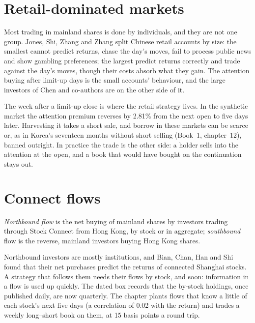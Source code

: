 \section{Retail-dominated markets}

Most trading in mainland shares is done by individuals, and they are not one group. Jones, Shi, Zhang and Zhang split Chinese retail accounts by
size: the smallest cannot predict returns, chase the day's moves, fail to process public news and show gambling preferences; the largest predict
returns correctly and trade against the day's moves, though their costs absorb what they gain. The attention buying after limit-up days is the
small accounts' behaviour, and the large investors of Chen and co-authors are on the other side of it.

The week after a limit-up close is where the retail strategy lives. In the synthetic market the attention premium reverses by 2.81\% from the next open
to five days later. Harvesting it takes a short sale, and borrow in these markets can be scarce or, as in Korea's seventeen months without short
selling (Book~1, chapter~12), banned outright. In practice the trade is the other side: a holder sells into the attention at the open, and a book that would have
bought on the continuation stays out.

\section{Connect flows}

\begin{definition}\label{def:s1:asia-specific-equity-strategies:northbound}
\emph{Northbound flow} is the net buying of mainland shares by investors trading through Stock Connect from Hong Kong, by
stock or in aggregate; \emph{southbound} flow is the reverse, mainland investors buying Hong Kong shares.
\end{definition}

Northbound investors are mostly institutions, and Bian, Chan, Han and Shi found that their net purchases predict the returns of connected Shanghai
stocks. A strategy that follows them needs their flows by stock, and soon: information in a flow is used up quickly. The dated box records that the
by-stock holdings, once published daily, are now quarterly. The chapter plants flows that know a little of each stock's next five days (a correlation of
0.02 with the return) and trades a weekly long--short book on them, at 15 basis points a round trip.


